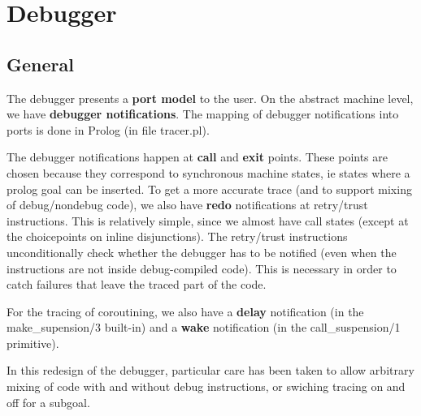 %
% 
% 
% 
% 
\section{Debugger}


\subsection{General}

The debugger presents a {\bf port model} to the user.
On the abstract machine level, we have {\bf debugger notifications}.
The mapping of debugger notifications into ports is done
in Prolog (in file tracer.pl).

The debugger notifications happen at {\bf call} and {\bf exit} points.  These
points are chosen because they correspond to synchronous machine
states, ie states where a prolog goal can be inserted.  To get a more
accurate trace (and to support mixing of debug/nondebug code), we also
have {\bf redo} notifications at retry/trust instructions.
This is relatively simple, since we almost
have call states (except at the choicepoints on inline disjunctions).
The retry/trust instructions unconditionally check whether the debugger
has to be notified (even when the instructions are not inside debug-compiled
code). This is necessary in order to catch failures that leave the traced part
of the code.

For the tracing of coroutining, we also have a {\bf delay} notification
(in the make_supension/3 built-in) and a {\bf wake} notification
(in the call_suspension/1 primitive).

In this redesign of the debugger, particular care has been taken to
allow arbitrary mixing of code with and without debug instructions,
or swiching tracing on and off for a subgoal.


